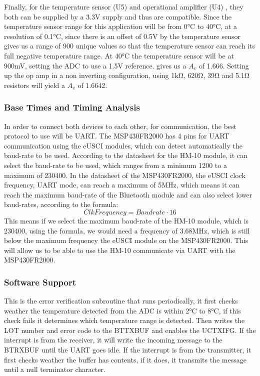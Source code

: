 Finally, for the temperature sensor (U5) \cite{TMP36GT9Z} and operational amplifier (U4) \cite{MCP6022I}, they both can be supplied by a 3.3\si{\V} supply and thus are compatible. Since the temperature sensor range for this application will be from 0\si{\celsius} to 40\si{\celsius}, at a resolution of 0.1\si{\celsius}, since there is an offset of 0.5\si{\V} by the temperature sensor gives us a range of 900 unique values so that the temperature sensor can reach its full negative temperature range. At 40\si{\celsius} the temperature sensor will be at 900\si{\milli\volt}, setting the ADC to use a 1.5\si{\V} reference. gives us a $A_{v}$ of 1.666. Setting up the op amp in a non inverting configuration, using 1\si{\kilo\ohm}, 620\si{\ohm}, 39\si{\ohm} and 5.1\si{\ohm} resistors will yield a $A_{v}$ of 1.6642.
\subsubsection{Base Times and Timing Analysis}
In order to connect both devices to each other, for communication, the best protocol to use will be UART. The MSP430FR2000 has 4 pins for UART communication using the eUSCI modules, which can detect automatically the baud-rate to be used. According to the datasheet for the HM-10 module\cite{AmazonComHiLetgo}, it can select the baud-rate to be used, which ranges from a minimum 1200 to a maximum of 230400. In the datasheet of the MSP430FR2000, the eUSCI clock frequency, UART mode, can reach a maximum of 5MHz, which means it can reach the maximum baud-rate of the Bluetooth module and can also select lower baud-rates, according to the formula:
\begin{equation}
	Clk Frequency = Baudrate \cdot 16
\end{equation}
This means if we select the maximum baud-rate of the HM-10 module, which is 230400, using the formula, we would need a frequency of 3.68MHz, which is still below the maximum frequency the eUSCI module on the MSP430FR2000. This will allow us to be able to use the HM-10 communicate via UART with the MSP430FR2000.\\
\subsubsection{Software Support}
This is the error verification subroutine that runs periodically, it first checks weather the temperature detected from the ADC is within 2\si{\celsius} to 8\si{\celsius}, if this check fails it determines which temperature range is detected. Then writes the LOT number and error code to the BTTXBUF and enables the UCTXIFG.
If the interrupt is from the receiver, it will write the incoming message to the BTRXBUF until the UART goes idle. If the interrupt is from the transmitter, it first checks weather the buffer has contents, if it does, it transmits the message until a null terminator character.
